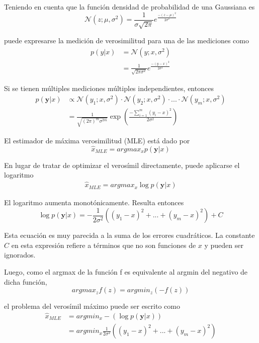 Teniendo en cuenta que la función densidad de probabilidad de una Gaussiana es
\begin{equation}
    \mathcal{N}(z;\mu,\sigma^2) = \frac{1}{\sigma \sqrt{2\pi}} e^{\frac{-(z-\mu)^2}{2\sigma^2}}
\end{equation}

puede expresarse la medición de verosimilitud para una de las mediciones como
\begin{align}
    p(y|x) &= \mathscr{N}(y;x,\sigma^2) \\
           &= \frac{1}{\sqrt{2\pi\sigma^2}} e^{\frac{-(y-x)^2}{2\sigma^2}}
\end{align}

Si se tienen múltiples mediciones múltiples independientes, entonces
\begin{align}
    p(\bm{y}|x) &\propto \mathscr{N}(y_1;x,\sigma^2)\cdot\mathscr{N}(y_2;x,\sigma^2)\cdot...\cdot\mathscr{N}(y_m;x,\sigma^2) \\
            &= \frac{1}{\sqrt{(2\pi)^m\sigma^{2m}}} \exp\left({\frac{-\sum_{i=1}^m(y_i-x)^2}{2\sigma^2}}\right)
\end{align}

El estimador de máxima verosimilitud (MLE) está dado por
\begin{equation}
    \hat{x}_{MLE} = argmax_x p(\bm{y}|x)
\end{equation}

En lugar de tratar de optimizar el verosímil directamente, puede aplicarse el logaritmo
\begin{align}
    \hat{x}_{MLE} = argmax_x \log p(\bm{y}|x)
\end{align}

El logaritmo aumenta monotónicamente. Resulta entonces
\begin{equation}
    \log p(\bm{y}|x) = -\frac{1}{2\sigma^2}\left((y_1-x)^2+...+(y_m-x)^2\right)+C
\end{equation}

Esta ecuación es muy parecida a la suma de los errores cuadráticos. La constante $C$ en esta expresión refiere a términos que no son funciones de $x$ y pueden ser ignorados.

Luego, como el argmax de la función f es equivalente al argmin del negativo de dicha función, 
\begin{equation}
    argmax_z f(z) = argmin_z \left(-f(z)\right)
\end{equation}

el problema del verosímil máximo puede ser escrito como
\begin{align}
    \hat{x}_{MLE} &= argmin_x -\left(\log p(\bm{y}|x)\right) \\
                  &= argmin_x \frac{1}{2\sigma^2}\left((y_1-x)^2+...+(y_m-x)^2\right)
\end{align}

